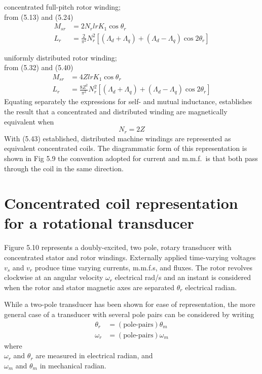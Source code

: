 \documentclass[a4paper,numbers=noenddot,12pt]{scrbook}
\begin{document}
        concentrated full-pitch rotor winding;\\
        from (5.13) and (5.24) 
        \begin{align*}
            M_{sr}  & =  2 N_r l r K_1 \cos \theta_r \\
            L_r & = \frac{2}{\pi^2} N_r^2 [(\varLambda_d + \varLambda_q) + (\varLambda_d - \varLambda_q) \cos 2 \theta_r ] 
        \end{align*}

        uniformly distributed rotor winding;\\
        from (5.32) and (5.40)
        \begin{align*}
            M_{sr}  & =  4 Z l r K_1 \cos \theta_r \\
            L_r & = \frac{8 Z^2}{\pi^2} N_r^2 [(\varLambda_d + \varLambda_q) + (\varLambda_d - \varLambda_q) \cos 2 \theta_r ]
        \end{align*}
        Equating separately the expressions for self- and mutual inductance, establishes the result that a concentrated and distributed winding are magnetically equivalent when
        \begin{equation}
            N_r = 2Z
        \end{equation}
        With (5.43) established, distributed machine windings are represented as equivalent concentrated coils. The diagrammatic form of this representation is shown in Fig 5.9 the convention adopted for current and m.m.f.\ is that both pass through the coil in the same direction.

        \section{Concentrated coil representation for a rotational transducer}
        Figure 5.10 represents a doubly-excited, two pole, rotary transducer with concentrated stator and rotor windings. Externally applied time-varying voltages $v_s$ and $v_r$ produce time varying currents, m.m.f.s, and fluxes. The rotor revolves clockwise at an angular velocity $\omega_r$ electrical rad/s and an instant is considered when the rotor and stator magnetic axes are separated $\theta_r$ electrical radian.

        While a two-pole transducer has been shown for ease of representation, the more general case of a transducer with several pole pairs can be considered by writing
        \begin{equation}
            \begin{aligned}
                \theta_r &= (\text{pole-pairs}) \theta_m \\
                \omega _r & = (\text{pole-pairs}) \omega_m
            \end{aligned}
        \end{equation}
        where\\
        \hspace*{4em} $\omega_r$ and $\theta_r$ are measured in electrical radian, and\\
        \hspace*{4em} $\omega_m$ and $\theta_m$ in mechanical radian.
\end{document}
